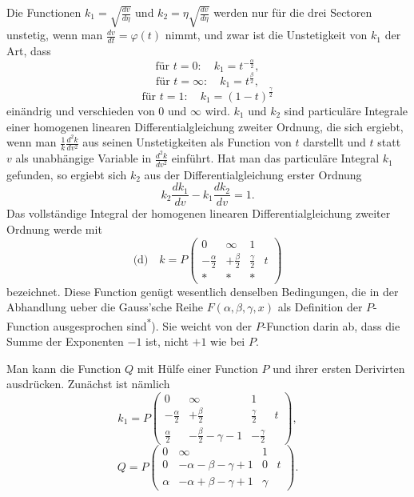 \documentclass[12pt,a4paper]{article}
\begin{document}
\newpage
Die Functionen $k_{1} = \sqrt{\frac{dv}{d\eta}}$ und $k_{2} = \eta\sqrt{\frac{dv}{d\eta}}$ werden nur f\"ur die drei Sectoren unstetig, wenn man $\frac{dv}{dt} = \varphi(t)$ nimmt, und zwar ist die Unstetigkeit von $k_{1}$ der Art, dass
\[\text{f\"ur } t = 0: \quad k_{1} = t^{-\frac{\alpha}{2}},\]
\[\text{f\"ur } t = \infty: \quad k_{1} = t^{\frac{\beta}{2}},\]
\[\text{f\"ur } t = 1: \quad k_{1} = (1-t)^{\frac{\gamma}{2}}\]
ein\"andrig und verschieden von $0$ und $\infty$ wird. $k_{1}$ und $k_{2}$ sind particul\"are Integrale einer homogenen linearen Differentialgleichung zweiter Ordnung, die sich ergiebt, wenn man $\frac{1}{k} \frac{d^{2}k}{dv^{2}}$ aus seinen Unstetigkeiten als Function von $t$ darstellt und $t$ statt $v$ als unabh\"angige Variable in $\frac{d^{2}k}{dv^{2}}$ einf\"uhrt. Hat man das particul\"are Integral $k_{1}$ gefunden, so ergiebt sich $k_{2}$ aus der Differentialgleichung erster Ordnung
\[k_{2} \frac{dk_{1}}{dv} - k_{1} \frac{dk_{2}}{dv} = 1.\]
Das vollst\"andige Integral der homogenen linearen Differentialgleichung zweiter Ordnung werde mit
\[\text{(d)} \quad k = P \begin{pmatrix} 0 & \infty & 1 \\ -\frac{\alpha}{2} & +\frac{\beta}{2} & \frac{\gamma}{2} & t \\ \ast & \ast & \ast \end{pmatrix}\]
bezeichnet. Diese Function gen\"ugt wesentlich denselben Bedingungen, die in der Abhandlung ueber die Gauss'sche Reihe $F(\alpha, \beta, \gamma, x)$ als Definition der $P$-Function ausgesprochen sind\textsuperscript{*}). Sie weicht von der $P$-Function darin ab, dass die Summe der Exponenten $-1$ ist, nicht $+1$ wie bei $P$.

Man kann die Function $Q$ mit H\"ulfe einer Function $P$ und ihrer ersten Derivirten ausdr\"ucken. Zun\"achst ist n\"amlich
\[k_{1} = P \begin{pmatrix} 0 & \infty & 1 & \\ -\frac{\alpha}{2} & +\frac{\beta}{2} & \frac{\gamma}{2} & t \\ \frac{\alpha}{2} & -\frac{\beta}{2}-\gamma-1 & -\frac{\gamma}{2} \end{pmatrix},\]
\[Q = P \begin{pmatrix} 0 & \infty & 1 \\ 0 & -\alpha-\beta-\gamma+1 & 0 & t \\ \alpha & -\alpha+\beta-\gamma+1 & \gamma \end{pmatrix}.\]
\end{document}
